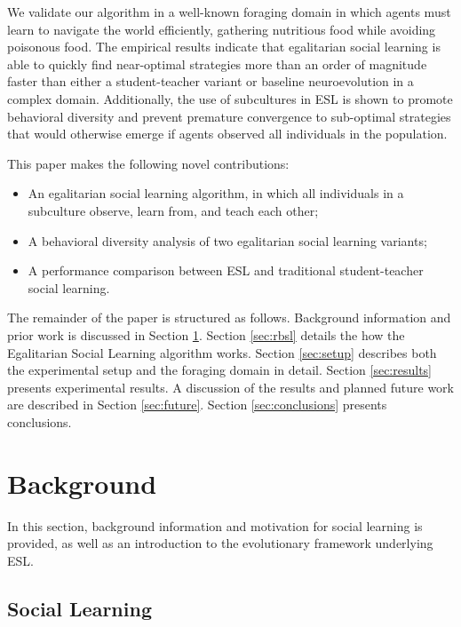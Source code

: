 \documentclass{sig-alternate}
\begin{document}
We validate our algorithm in a well-known foraging domain \cite{denaro1996cultural,haasdijk2008social,vogt2010modeling,acerbi2007social,de2011incremental} in which agents must learn to navigate the world efficiently, gathering nutritious food while avoiding poisonous food. The empirical results indicate that egalitarian social learning is able to quickly find near-optimal strategies more than an order of magnitude faster than either a student-teacher variant or baseline neuroevolution in a complex domain. Additionally, the use of subcultures in ESL is shown to promote behavioral diversity and prevent premature convergence to sub-optimal strategies that would otherwise emerge if agents observed all individuals in the population.

This paper makes the following novel contributions:
 
\begin{itemize}
\item An egalitarian social learning algorithm, in which all individuals in a subculture observe, learn from, and teach each other;
\item A behavioral diversity analysis of two egalitarian social learning variants;
\item A performance comparison between ESL and traditional student-teacher social learning.
\end{itemize}
 
The remainder of the paper is structured as follows.
Background information and prior work is discussed in Section \ref{sec:background}.
Section \ref{sec:rbsl} details the how the Egalitarian Social Learning algorithm works. Section \ref{sec:setup} describes both the experimental setup and the foraging domain in detail.
Section \ref{sec:results} presents experimental results.
A discussion of the results and planned future work are described in Section \ref{sec:future}.
Section \ref{sec:conclusions} presents conclusions.

\section{Background}
\label{sec:background}
In this section, background information and motivation for social learning is provided, as well as an introduction to the evolutionary framework underlying ESL.

\subsection{Social Learning}
\end{document}
